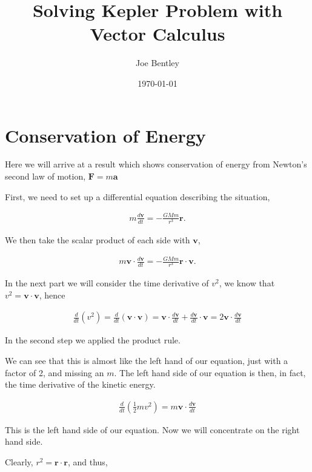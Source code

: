 \documentclass[11pt]{amsart}
\title{Solving Kepler Problem with Vector Calculus}
\author{Joe Bentley}
\date{\today}
\begin{document}
\maketitle

\newpage


\section{Conservation of Energy}

Here we will arrive at a result which shows conservation of energy from Newton's second law of motion, $\mathbf{F} = m \mathbf{a}$

First, we need to set up a differential equation describing the situation,

\begin{align}
  \label{eq:raw}
  m \frac{d \mathbf{v}}{d t} = - \frac{GMm}{r^3} \mathbf{r}.
\end{align}

We then take the scalar product of each side with $\mathbf{v}$,

\begin{align}
  \label{eq:dotted}
  m \mathbf{v} \cdot \frac{d \mathbf{v}}{d t} = - \frac{GMm}{r^3} \mathbf{r} \cdot \mathbf{v}.
\end{align}

In the next part we will consider the time derivative of $v^2$, we know that $v^2 = \mathbf{v} \cdot \mathbf{v}$, hence

\begin{align*}
  \frac{d}{dt}(v^2) = \frac{d}{dt}(\mathbf{v} \cdot \mathbf{v}) = \mathbf{v} \cdot \frac{d\mathbf{v}}{dt} + \frac{d\mathbf{v}}{dt} \cdot \mathbf{v} = 2 \mathbf{v} \cdot \frac{d\mathbf{v}}{dt}
\end{align*}

In the second step we applied the product rule.

We can see that this is almost like the left hand of our equation, just with a factor of 2, and missing an $m$. The left hand side of our equation is then, in fact, the time derivative of the kinetic energy.

\begin{align*}
  \frac{d}{dt}\left(\frac{1}{2}mv^2\right) = m\mathbf{v}\cdot\frac{d\mathbf{v}}{dt}
\end{align*}

This is the left hand side of our equation. Now we will concentrate on the right hand side.

Clearly, $r^2 = \mathbf{r} \cdot \mathbf{r}$, and thus,
\end{document}
